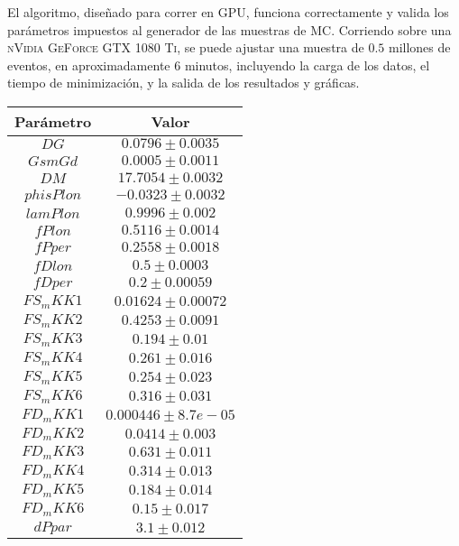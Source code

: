 El algoritmo, diseñado para correr en GPU, funciona correctamente y valida los parámetros impuestos al generador de las muestras de MC. Corriendo sobre una \textsc{nVidia GeForce GTX 1080 Ti}, se puede ajustar una muestra de $0.5$ millones de eventos, en aproximadamente $6$ minutos, incluyendo la carga de los datos, el tiempo de minimización, y la salida de los resultados y gráficas.











\begin{table}[H]
\centering
\begin{multicols}{2}
\begin{tabular}{cc}
\toprule
Parámetro & Valor \\ \midrule
$DG        $&$ 0.0796 \pm 0.0035  $\\
$GsmGd     $&$ 0.0005 \pm 0.0011  $\\
$DM        $&$ 17.7054 \pm 0.0032 $\\
$phisPlon  $&$ -0.0323 \pm 0.0032 $\\
$lamPlon   $&$  0.9996 \pm 0.002  $\\
$fPlon     $&$ 0.5116 \pm 0.0014  $\\
$fPper     $&$ 0.2558 \pm 0.0018  $\\
$fDlon     $&$   0.5 \pm 0.0003   $\\
$fDper     $&$  0.2 \pm 0.00059   $\\
$FS_mKK1   $&$0.01624 \pm 0.00072 $\\
$FS_mKK2   $&$ 0.4253 \pm 0.0091  $\\
$FS_mKK3   $&$   0.194 \pm 0.01   $\\
$FS_mKK4   $&$  0.261 \pm 0.016   $\\
$FS_mKK5   $&$  0.254 \pm 0.023   $\\
$FS_mKK6   $&$  0.316 \pm 0.031   $\\
$FD_mKK1   $&$0.000446 \pm 8.7e-05$\\
$FD_mKK2   $&$  0.0414 \pm 0.003  $\\
$FD_mKK3   $&$  0.631 \pm 0.011   $\\
$FD_mKK4   $&$  0.314 \pm 0.013   $\\
$FD_mKK5   $&$  0.184 \pm 0.014   $\\
$FD_mKK6   $&$   0.15 \pm 0.017   $\\
$dPpar     $&$   3.1 \pm 0.012    $\\

\end{tabular}
\end{multicols}
\end{table}
